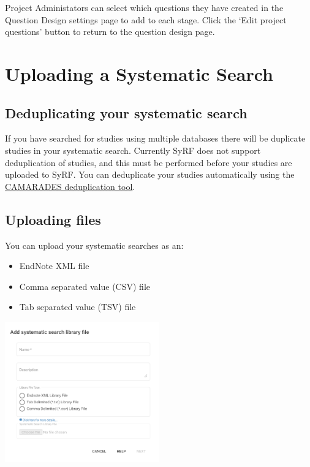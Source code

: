 \documentclass[
]{book}
\providecommand{\tightlist}{%
  \setlength{\itemsep}{0pt}\setlength{\parskip}{0pt}}
\begin{document}
Project Administators can select which questions they have created in the Question Design settings page to add to each stage. Click the `Edit project questions' button to return to the question design page.

\hypertarget{systematicSearch}{%
\chapter{Uploading a Systematic Search}\label{systematicSearch}}

\hypertarget{deduplicating-your-systematic-search}{%
\section{Deduplicating your systematic search}\label{deduplicating-your-systematic-search}}

If you have searched for studies using multiple databases there will be duplicate studies in your systematic search. Currently SyRF does not support deduplication of studies, and this must be performed before your studies are uploaded to SyRF. You can deduplicate your studies automatically using the \href{https://camarades.shinyapps.io/RDedup/}{CAMARADES deduplication tool}.

\hypertarget{uploading-files}{%
\section{Uploading files}\label{uploading-files}}

You can upload your systematic searches as an:

\begin{itemize}
\tightlist
\item
  EndNote XML file
\item
  Comma separated value (CSV) file
\item
  Tab separated value (TSV) file
\end{itemize}

\includegraphics[width=0.5\textwidth,height=0.5\textheight]{figs/07_01_upload_search.png}
\end{document}
